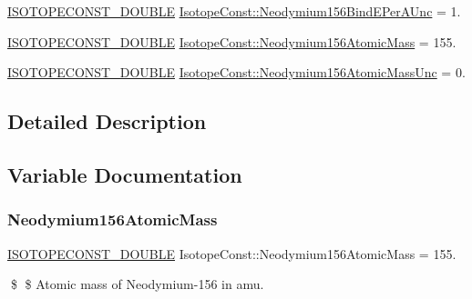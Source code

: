 \begin{DoxyCompactItemize}
\mbox{\hyperlink{group___isotope_const-_macros_ga8f45a7272ce02c0b4c65c44636ed719a}{I\+S\+O\+T\+O\+P\+E\+C\+O\+N\+S\+T\+\_\+\+D\+O\+U\+B\+LE}} \mbox{\hyperlink{group___isotope_const-_neodymium-_nd156_ga321244437399c3f4e04794d5345be948}{Isotope\+Const\+::\+Neodymium156\+Bind\+E\+Per\+A\+Unc}} = 1.
\item 
\mbox{\hyperlink{group___isotope_const-_macros_ga8f45a7272ce02c0b4c65c44636ed719a}{I\+S\+O\+T\+O\+P\+E\+C\+O\+N\+S\+T\+\_\+\+D\+O\+U\+B\+LE}} \mbox{\hyperlink{group___isotope_const-_neodymium-_nd156_gaef3547a8dbf905e8e37b61cbea82f613}{Isotope\+Const\+::\+Neodymium156\+Atomic\+Mass}} = 155.
\item 
\mbox{\hyperlink{group___isotope_const-_macros_ga8f45a7272ce02c0b4c65c44636ed719a}{I\+S\+O\+T\+O\+P\+E\+C\+O\+N\+S\+T\+\_\+\+D\+O\+U\+B\+LE}} \mbox{\hyperlink{group___isotope_const-_neodymium-_nd156_ga06286350fc260ea6fdf544407f98a0f1}{Isotope\+Const\+::\+Neodymium156\+Atomic\+Mass\+Unc}} = 0.
\end{DoxyCompactItemize}


\subsection{Detailed Description}


\subsection{Variable Documentation}
\mbox{\label{group___isotope_const-_neodymium-_nd156_gaef3547a8dbf905e8e37b61cbea82f613}} 
\subsubsection{\texorpdfstring{Neodymium156\+Atomic\+Mass}{Neodymium156AtomicMass}}
{\footnotesize\ttfamily \mbox{\hyperlink{group___isotope_const-_macros_ga8f45a7272ce02c0b4c65c44636ed719a}{I\+S\+O\+T\+O\+P\+E\+C\+O\+N\+S\+T\+\_\+\+D\+O\+U\+B\+LE}} Isotope\+Const\+::\+Neodymium156\+Atomic\+Mass = 155.}

\$ \$ Atomic mass of Neodymium-\/156 in amu. \mbox{\label{group___isotope_const-_neodymium-_nd156_ga06286350fc260ea6fdf544407f98a0f1}} 

